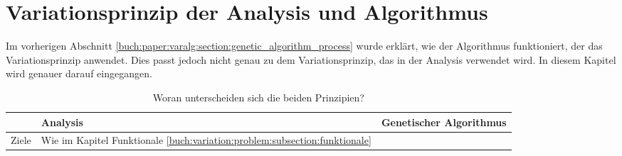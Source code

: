 %
%
%
%
\section{Variationsprinzip der Analysis und Algorithmus
  \label{buch:paper:varalg:section:variations_analysis_algorithm_result}}
Im vorherigen Abschnitt \ref{buch:paper:varalg:section:genetic_algorithm_process} wurde erklärt, 
wie der Algorithmus funktioniert, der das Variationsprinzip anwendet. Dies 
passt jedoch nicht genau zu dem Variationsprinzip, das in der Analysis 
verwendet wird. In diesem Kapitel wird genauer darauf eingegangen.
\begin{table}
   \centering
   \caption{Woran unterscheiden sich die beiden Prinzipien?}
   \begin{tabularx}{\textwidth}{|L|X|X|}
      \hline
       & Analysis 
       & Genetischer Algorithmus 
      \\ \hline
      Ziele  
       & Wie im Kapitel Funktionale \ref{buch:variation:problem:subsection:funktionale}


\end{tabularx}
\end{table}
